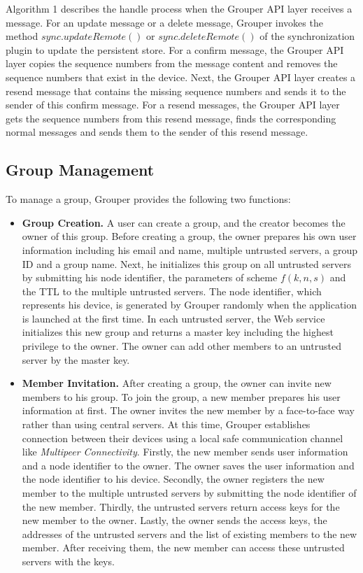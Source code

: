 \documentclass[twocolumn,10pt]{article}
\begin{document}
Algorithm 1 describes the handle process when the Grouper API layer receives a message.
For an update message or a delete message, Grouper invokes the method $sync.updateRemote()$ or $sync.deleteRemote()$ of the synchronization plugin to update the persistent store.
For a confirm message, the Grouper API layer copies the sequence numbers from the message content and removes the sequence numbers that exist in the device.
Next, the Grouper API layer creates a resend message that contains the missing sequence numbers and sends it to the sender of this confirm message.
For a resend messages, the Grouper API layer gets the sequence numbers from this resend message, finds the corresponding normal messages and sends them to the sender of this resend message.

\subsection{Group Management}

To manage a group, Grouper provides the following two functions:

\begin{itemize}
	\setlength{\itemsep}{1pt}
	\setlength{\parskip}{0pt}
	\setlength{\parsep}{0pt}
	\item \textbf{Group Creation.}
	A user can create a group, and the creator becomes the owner of this group.  
	Before creating a group, the owner prepares his own user information including his email and name, multiple untrusted servers, a group ID and a group name. 
	Next, he initializes this group on all untrusted servers by submitting his node identifier, the parameters of scheme $f(k, n, s)$ and the TTL to the multiple untrusted servers. 
	The node identifier, which represents his device, is generated by Grouper randomly when the application is launched at the first time. 
	In each untrusted server, the Web service initializes this new group and returns a master key including the highest privilege to the owner. 
	The owner can add other members to an untrusted server by the master key.
	\item \textbf{Member Invitation.} 
	After creating a group, the owner can invite new members to his group. 
	To join the group, a new member prepares his user information at first. 
	The owner invites the new member by a face-to-face way rather than using central servers. 
	At this time, Grouper establishes connection between their devices using a local safe communication channel like \emph{Multipeer Connectivity}\cite{mc}. 
	Firstly, the new member sends user information and a node identifier to the owner. 
	The owner saves the user information and the node identifier to his device. 
	Secondly, the owner registers the new member to the multiple untrusted servers by submitting the node identifier of the new member. 
	Thirdly, the untrusted servers return access keys for the new member to the owner. 
	Lastly, the owner sends the access keys, the addresses of the untrusted servers and the list of existing members to the new member. 
	After receiving them, the new member can access these untrusted servers with the keys.
\end{itemize}
\end{document}
